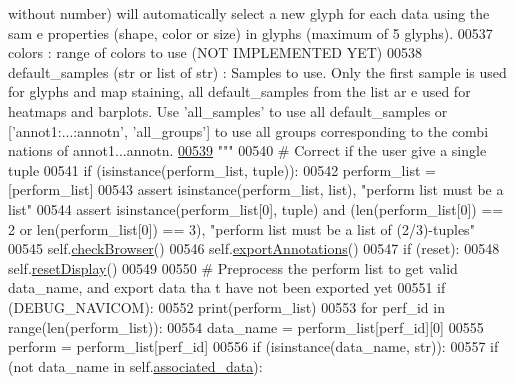 \begin{DoxyCode}
{      without number) will automatically select a new glyph for each data using the sam
      e properties (shape, color or size) in glyphs (maximum of 5 glyphs).}
00537 \textcolor{stringliteral}{            colors : range of colors to use (NOT IMPLEMENTED YET)}
00538 \textcolor{stringliteral}{            default\_samples (str or list of str) : Samples to use. Only the first
       sample is used for glyphs and map staining, all default\_samples from the list ar
      e used for heatmaps and barplots. Use 'all\_samples' to use all default\_samples or
       ['annot1:...:annotn', 'all\_groups'] to use all groups corresponding to the combi
      nations of annot1...annotn.}
\hypertarget{navicom_8py_source_l00539}{}\hyperlink{classnavicom_1_1navicom_1_1NaviCom_ad7d4390d700d4a6d2533647887f8ab94}{00539} \textcolor{stringliteral}{        """}
00540         \textcolor{comment}{# Correct if the user give a single tuple}
00541         \textcolor{keywordflow}{if} (isinstance(perform\_list, tuple)):
00542             perform\_list = [perform\_list]
00543         \textcolor{keyword}{assert} isinstance(perform\_list, list), \textcolor{stringliteral}{"perform list must be a list"}
00544         \textcolor{keyword}{assert} isinstance(perform\_list[0], tuple) \textcolor{keywordflow}{and} (len(perform\_list[0]) == 2 
      \textcolor{keywordflow}{or} len(perform\_list[0]) == 3), \textcolor{stringliteral}{"perform list must be a list of (2/3)-tuples"}
00545         self.\hyperlink{classnavicom_1_1navicom_1_1NaviCom_aa7aadc5d33a24f0fd5705e363c0fedcb}{checkBrowser}()
00546         self.\hyperlink{classnavicom_1_1navicom_1_1NaviCom_a5a59edead26b5d02f17a60df055576f5}{exportAnnotations}()
00547         \textcolor{keywordflow}{if} (reset):
00548             self.\hyperlink{classnavicom_1_1navicom_1_1NaviCom_a379f15a87ba5c41c3501e9f386102c05}{resetDisplay}()
00549 
00550         \textcolor{comment}{# Preprocess the perform list to get valid data\_name, and export data tha
      t have not been exported yet}
00551         \textcolor{keywordflow}{if} (DEBUG\_NAVICOM):
00552             \textcolor{keywordflow}{print}(perform\_list)
00553         \textcolor{keywordflow}{for} perf\_id \textcolor{keywordflow}{in} range(len(perform\_list)):
00554             data\_name = perform\_list[perf\_id][0]
00555             perform = perform\_list[perf\_id]
00556             \textcolor{keywordflow}{if} (isinstance(data\_name, str)):
00557                 \textcolor{keywordflow}{if} (\textcolor{keywordflow}{not} data\_name \textcolor{keywordflow}{in} self.\hyperlink{classnavicom_1_1navicom_1_1NaviCom_a1d7072ae29e32d7ddd1da9cc5def7199}{associated_data}):

\end{DoxyCode}
